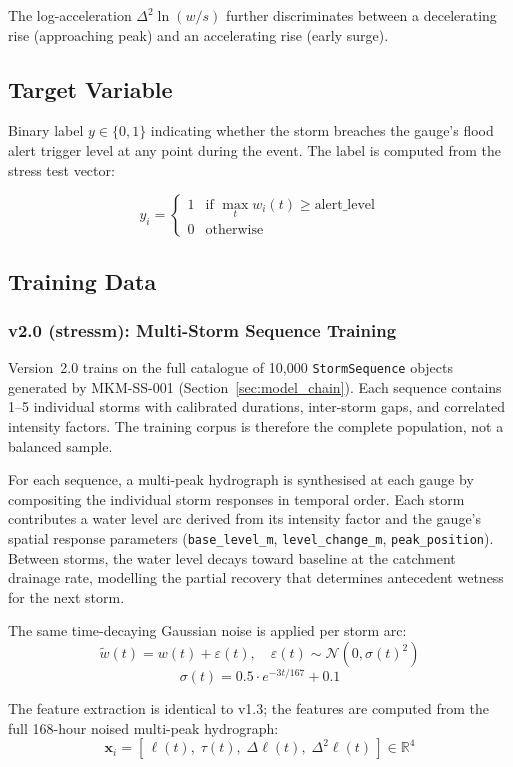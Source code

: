 \documentclass[11pt,a4paper]{article}
\begin{document}
\noindent The log-acceleration $\Delta^2\ln(w/s)$ further discriminates between a
decelerating rise (approaching peak) and an accelerating rise (early surge).

\subsection{Target Variable}
Binary label $y \in \{0, 1\}$ indicating whether the storm breaches the gauge's
flood alert trigger level at any point during the event. The label is computed from
the stress test vector:

\[
y_i = \begin{cases}
1 & \text{if } \max_{t} w_i(t) \geq \text{alert\_level} \\
0 & \text{otherwise}
\end{cases}
\]

\subsection{Training Data}

\subsubsection{v2.0 (stressm): Multi-Storm Sequence Training}

Version~2.0 trains on the full catalogue of 10{,}000 \texttt{StormSequence} objects
generated by MKM-SS-001 (Section~\ref{sec:model_chain}). Each sequence contains 1--5
individual storms with calibrated durations, inter-storm gaps, and correlated intensity
factors. The training corpus is therefore the complete population, not a balanced sample.

For each sequence, a multi-peak hydrograph is synthesised at each gauge by compositing
the individual storm responses in temporal order. Each storm contributes a water level
arc derived from its intensity factor and the gauge's spatial response parameters
(\texttt{base\_level\_m}, \texttt{level\_change\_m}, \texttt{peak\_position}).
Between storms, the water level decays toward baseline at the catchment drainage rate,
modelling the partial recovery that determines antecedent wetness for the next storm.

The same time-decaying Gaussian noise is applied per storm arc:
\[
\tilde{w}(t) = w(t) + \varepsilon(t), \quad
\varepsilon(t) \sim \mathcal{N}\!\left(0, \sigma(t)^2\right)
\]
\[
\sigma(t) = 0.5 \cdot e^{-3t / 167} + 0.1
\]

The feature extraction is identical to v1.3; the features are computed from the full
168-hour noised multi-peak hydrograph:
\[
\mathbf{x}_i = \left[\, \ell(t),\; \tau(t),\; \Delta\ell(t),\; \Delta^2\ell(t) \,\right]
\in \mathbb{R}^4
\]
\end{document}
